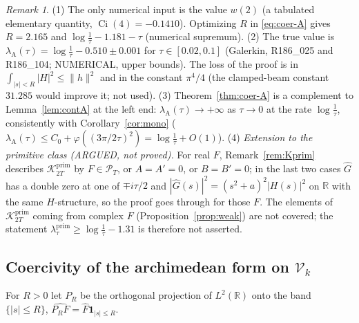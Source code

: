 \documentclass[11pt]{amsart}
\theoremstyle{definition}
\theoremstyle{remark}
\newtheorem{remark}[theorem]{Remark}
\newcommand{\R}{\mathbb R}
\newcommand{\Kp}{\mathcal K^{\mathrm{prim}}_{2T}}
\newcommand{\PT}{\mathcal P_T}
\newcommand{\Fh}{\widehat F}
\begin{document}
\begin{remark}\label{rem:coer-A}
(1) The only numerical input is the value $w(2)$ (a tabulated elementary quantity, $\operatorname{Ci}(4)=-0.1410$).
Optimizing $R$ in \eqref{eq:coer-A} gives $R=2.165$ and $\log\frac1\tau-1.181-\tau$ (numerical
supremum). (2) The true value is $\lambda_{\mathrm A}(\tau)=\log\frac1\tau-0.510\pm0.001$ for $\tau\in[0.02,0.1]$
(Galerkin, R186\_025 and R186\_104; NUMERICAL, upper bounds). The loss of the proof is in
$\int_{|s|<R}|H|^2\le\|h\|^2$ and in the constant $\pi^4/4$ (the clamped-beam constant $31.285$ would
improve it; not used). (3) Theorem~\ref{thm:coer-A} is a complement to Lemma~\ref{lem:contA} at the
left end: $\lambda_{\mathrm A}(\tau)\to+\infty$ as $\tau\to0$ at the rate $\log\frac1\tau$, consistently with
Corollary~\ref{cor:mono} ($\lambda_{\mathrm A}(\tau)\le C_0+\varphi((3\pi/2\tau)^2)=\log\frac1\tau+O(1)$).
(4) \emph{Extension to the primitive class (ARGUED, not proved).} For real $F$, Remark~\ref{rem:Kprim}
describes $\Kp$ by $F\in\PT$, or $A=A'=0$, or $B=B'=0$; in the last two cases $\widehat G$ has a double zero at
one of $\mp i\tau/2$ and $|\widehat G(s)|^2=(s^2+a)^2|H(s)|^2$ on $\R$ with the same $H$-structure, so the proof
goes through for those $F$. The elements of $\Kp$ coming from complex $F$ (Proposition~\ref{prop:weak}) are
not covered; the statement $\lambda^{\mathrm{prim}}_\tau\ge\log\frac1\tau-1.31$ is therefore not asserted.
\end{remark}

\subsection{Coercivity of the archimedean form on $\mathcal V_k$}\label{subsec:coer-B}

For $R>0$ let $P_R$ be the orthogonal projection of $L^2(\R)$ onto the band $\{|s|\le R\}$,
$\widehat{P_RF}=\Fh\mathbf 1_{|s|\le R}$.
\end{document}
